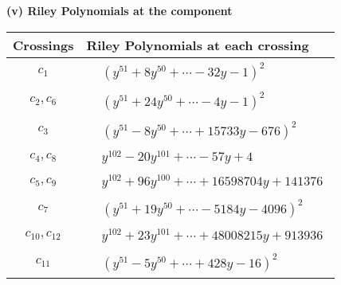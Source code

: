 \documentclass[1p]{elsarticle_modified}
\theoremstyle{definition}
\begin{document}
\newpage\renewcommand{\arraystretch}{1}
\flushleft \textbf{(v) Riley Polynomials at the component}\newline \\
\begin{tabular}{m{50pt}|m{274pt}}
Crossings & \hspace{64pt}Riley Polynomials at each crossing \\
\hline $$\begin{aligned}c_{1}\end{aligned}$$&$\begin{aligned}
&(y^{51}+8 y^{50}+\cdots-32 y-1)^{2}
\end{aligned}$\\
\hline $$\begin{aligned}c_{2},c_{6}\end{aligned}$$&$\begin{aligned}
&(y^{51}+24 y^{50}+\cdots-4 y-1)^{2}
\end{aligned}$\\
\hline $$\begin{aligned}c_{3}\end{aligned}$$&$\begin{aligned}
&(y^{51}-8 y^{50}+\cdots+15733 y-676)^{2}
\end{aligned}$\\
\hline $$\begin{aligned}c_{4},c_{8}\end{aligned}$$&$\begin{aligned}
&y^{102}-20 y^{101}+\cdots-57 y+4
\end{aligned}$\\
\hline $$\begin{aligned}c_{5},c_{9}\end{aligned}$$&$\begin{aligned}
&y^{102}+96 y^{100}+\cdots+16598704 y+141376
\end{aligned}$\\
\hline $$\begin{aligned}c_{7}\end{aligned}$$&$\begin{aligned}
&(y^{51}+19 y^{50}+\cdots-5184 y-4096)^{2}
\end{aligned}$\\
\hline $$\begin{aligned}c_{10},c_{12}\end{aligned}$$&$\begin{aligned}
&y^{102}+23 y^{101}+\cdots+48008215 y+913936
\end{aligned}$\\
\hline $$\begin{aligned}c_{11}\end{aligned}$$&$\begin{aligned}
&(y^{51}-5 y^{50}+\cdots+428 y-16)^{2}
\end{aligned}$\\
\hline
\end{tabular}\\~\\
\end{document}
